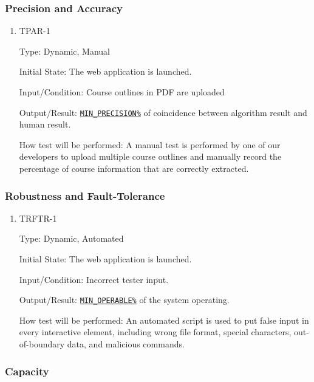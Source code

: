 \documentclass[12pt, titlepage]{article}
\begin{document}
\begin{enumerate}
\begin{enumerate}
\end{enumerate}
\subsubsection{Precision and Accuracy}

\begin{enumerate}
\item{TPAR-1\\}\label{TPAR-1}

Type: Dynamic, Manual
					
Initial State: The web application is launched.
					
Input/Condition:  Course outlines in PDF are uploaded
					
Output/Result: \hyperref[MIN_PRECISION]{\texttt{MIN\_PRECISION\%}} of coincidence between algorithm result and human result.
					
How test will be performed: A manual test is performed by one of our developers to upload multiple course outlines and manually record the percentage of course information that are correctly extracted. 

\end{enumerate}

\subsubsection{Robustness and Fault-Tolerance}

\begin{enumerate}
\item{TRFTR-1\\}\label{TRFTR-1}

Type: Dynamic, Automated
					
Initial State: The web application is launched.
					
Input/Condition: Incorrect tester input.
					
Output/Result: \hyperref[MIN_OPERABLE]{\texttt{MIN\_OPERABLE\%}} of the system operating.
					
How test will be performed: An automated script is used to put false input in every interactive element, including wrong file format, special characters, out-of-boundary data, and malicious commands.
\end{enumerate}
\subsubsection{Capacity}


\end{enumerate}
\end{document}
